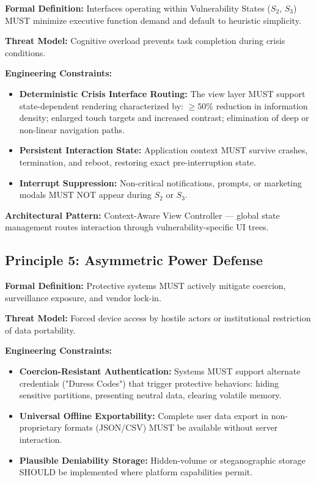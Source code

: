 \documentclass[acmsmall,review]{acmart}
\begin{document}
\textbf{Formal Definition:} Interfaces operating within Vulnerability States ($S_2$, $S_3$) MUST minimize executive function demand and default to heuristic simplicity.

\textbf{Threat Model:} Cognitive overload prevents task completion during crisis conditions.

\textbf{Engineering Constraints:}

\begin{itemize}
    \item \textbf{Deterministic Crisis Interface Routing:} The view layer MUST support state-dependent rendering characterized by: $\ge 50\%$ reduction in information density; enlarged touch targets and increased contrast; elimination of deep or non-linear navigation paths.
    \item \textbf{Persistent Interaction State:} Application context MUST survive crashes, termination, and reboot, restoring exact pre-interruption state.
    \item \textbf{Interrupt Suppression:} Non-critical notifications, prompts, or marketing modals MUST NOT appear during $S_2$ or $S_3$.
\end{itemize}

\textbf{Architectural Pattern:} Context-Aware View Controller --- global state management routes interaction through vulnerability-specific UI trees.

\subsection{Principle 5: Asymmetric Power Defense}

\textbf{Formal Definition:} Protective systems MUST actively mitigate coercion, surveillance exposure, and vendor lock-in.

\textbf{Threat Model:} Forced device access by hostile actors or institutional restriction of data portability.

\textbf{Engineering Constraints:}

\begin{itemize}
    \item \textbf{Coercion-Resistant Authentication:} Systems MUST support alternate credentials ("Duress Codes") that trigger protective behaviors: hiding sensitive partitions, presenting neutral data, clearing volatile memory.
    \item \textbf{Universal Offline Exportability:} Complete user data export in non-proprietary formats (JSON/CSV) MUST be available without server interaction.
    \item \textbf{Plausible Deniability Storage:} Hidden-volume or steganographic storage SHOULD be implemented where platform capabilities permit.
\end{itemize}
\end{document}
